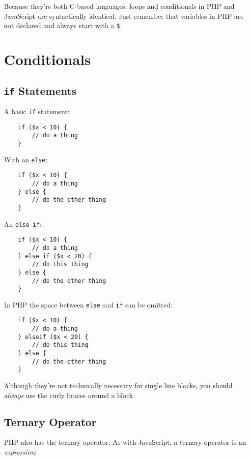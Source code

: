 Because they're both C-based languages, loops and conditionals in PHP and JavaScript are syntactically identical. Just remember that variables in PHP are not declared and always start with a \texttt{\$}.

\section{Conditionals}

\subsection{\texttt{if} Statements}

A basic \texttt{if} statement:

\begin{verbatim}
    if ($x < 10) {
        // do a thing
    }
\end{verbatim}

With an \texttt{else}:

\begin{verbatim}
    if ($x < 10) {
        // do a thing
    } else {
        // do the other thing
    }
\end{verbatim}


\pagebreak


An \texttt{else if}:

\begin{verbatim}
    if ($x < 10) {
        // do a thing
    } else if ($x < 20) {
        // do this thing
    } else {
        // do the other thing
    }
\end{verbatim}

In PHP the space between \texttt{else} and \texttt{if} can be omitted:

\begin{verbatim}
    if ($x < 10) {
        // do a thing
    } elseif ($x < 20) {
        // do this thing
    } else {
        // do the other thing
    }
\end{verbatim}

Although they're not technically necessary for single line blocks, you should \textit{always} use the curly braces around a block.


\subsection{Ternary Operator}

PHP also has the ternary operator. As with JavaScript, a ternary operator is an \textit{expression}:

